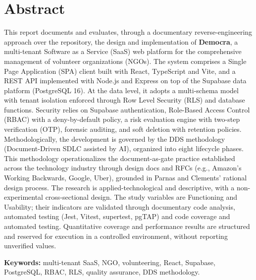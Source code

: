 \chapter*{Abstract}
This report documents and evaluates, through a documentary reverse-engineering approach over the
repository, the design and implementation of \textbf{Democra}, a multi-tenant Software as a Service
(SaaS) web platform for the comprehensive management of volunteer organizations (NGOs). The system
comprises a Single Page Application (SPA) client built with React, TypeScript and Vite, and a REST
API implemented with Node.js and Express on top of the Supabase data platform (PostgreSQL 16). At the
data level, it adopts a multi-schema model with tenant isolation enforced through Row Level Security
(RLS) and database functions. Security relies on Supabase authentication, Role-Based Access Control
(RBAC) with a deny-by-default policy, a risk evaluation engine with two-step verification (OTP),
forensic auditing, and soft deletion with retention policies. Methodologically, the development is governed
by the DDS methodology (Document-Driven SDLC assisted by AI), organized into eight lifecycle
phases. This methodology operationalizes the document-as-gate practice established across the
technology industry through design docs and RFCs (e.g., Amazon's Working Backwards, Google, Uber),
grounded in Parnas and Clements' rational design process. The research is applied-technological and descriptive, with a non-experimental cross-sectional
design. The study variables are Functioning and Usability; their indicators are validated through
documentary code analysis, automated testing (Jest, Vitest, supertest, pgTAP) and code coverage and automated testing. Quantitative coverage and performance results are structured and
reserved for execution in a controlled environment, without reporting unverified values.

\vspace{0.3cm}
\noindent\textbf{Keywords:} multi-tenant SaaS, NGO, volunteering, React, Supabase, PostgreSQL, RBAC,
RLS, quality assurance, DDS methodology.
